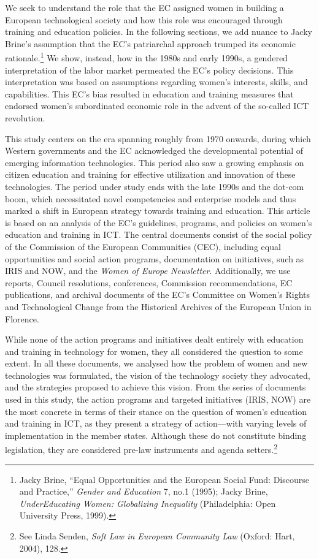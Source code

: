 \documentclass{tufte-handout}
\begin{document}
We seek to understand the role that the EC assigned women in building a
European technological society and how this role was encouraged through
training and education policies. In the following sections, we add
nuance to Jacky Brine's assumption that the EC's patriarchal approach
trumped its economic rationale.\footnote{Jacky Brine, ``Equal
  Opportunities and the European Social Fund: Discourse and Practice,''
  \emph{Gender and Education} 7, no.1 (1995); Jacky Brine,
  \emph{UnderEducating Women: Globalizing Inequality} (Philadelphia:
  Open University Press, 1999).} We show, instead, how in the 1980s and
early 1990s, a gendered interpretation of the labor market permeated the
EC's policy decisions. This interpretation was based on assumptions
regarding women's interests, skills, and capabilities. This EC's bias
resulted in education and training measures that endorsed women's
subordinated economic role in the advent of the so-called ICT
revolution.

This study centers on the era spanning roughly from 1970 onwards, during
which Western governments and the EC acknowledged the developmental
potential of emerging information technologies. This period also saw a
growing emphasis on citizen education and training for effective
utilization and innovation of these technologies. The period under study
ends with the late 1990s and the dot-com boom, which necessitated novel
competencies and enterprise models and thus marked a shift in European
strategy towards training and education. This article is based on an
analysis of the EC's guidelines, programs, and policies on women's
education and training in ICT. The central documents consist of the
social policy of the Commission of the European Communities (CEC),
including equal opportunities and social action programs, documentation
on initiatives, such as IRIS and NOW, and the \emph{Women of Europe
Newsletter}. Additionally, we use reports, Council resolutions,
conferences, Commission recommendations, EC publications, and archival
documents of the EC's Committee on Women's Rights and Technological
Change from the Historical Archives of the European Union in Florence.

While none of the action programs and initiatives dealt entirely with
education and training in technology for women, they all considered the
question to some extent. In all these documents, we analysed how the
problem of women and new technologies was formulated, the vision of the
technology society they advocated, and the strategies proposed to
achieve this vision. From the series of documents used in this study,
the action programs and targeted initiatives (IRIS, NOW) are the most
concrete in terms of their stance on the question of women's education
and training in ICT, as they present a strategy of action---with varying
levels of implementation in the member states. Although these do not
constitute binding legislation, they are considered pre-law instruments
and agenda setters.\footnote{See Linda Senden, \emph{Soft Law in
  European Community Law} (Oxford: Hart, 2004), 128.}
\end{document}
